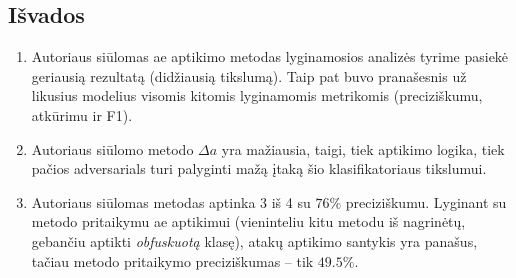 \subsection*{Išvados}

\begin{enumerate}
    \item Autoriaus siūlomas \gls{ae} aptikimo metodas lyginamosios analizės tyrime pasiekė geriausią rezultatą (didžiausią tikslumą). Taip pat buvo pranašesnis už likusius modelius visomis kitomis lyginamomis metrikomis (preciziškumu, atkūrimu ir F1).
    \item Autoriaus siūlomo metodo $\Delta a$ yra mažiausia, taigi, tiek  aptikimo logika, tiek pačios \glspl{adversarial} turi palyginti mažą įtaką šio klasifikatoriaus tikslumui.
    \item Autoriaus siūlomas metodas aptinka 3 iš 4  su $\num{76}\%$ preciziškumu. Lyginant su \LIME metodo pritaikymu \gls{ae} aptikimui (vieninteliu kitu metodu iš nagrinėtų, gebančiu aptikti \textit{obfuskuotą} klasę), atakų aptikimo santykis yra panašus, tačiau \LIME metodo pritaikymo preciziškumas -- tik $\num{49,5}\%$.
\end{enumerate}